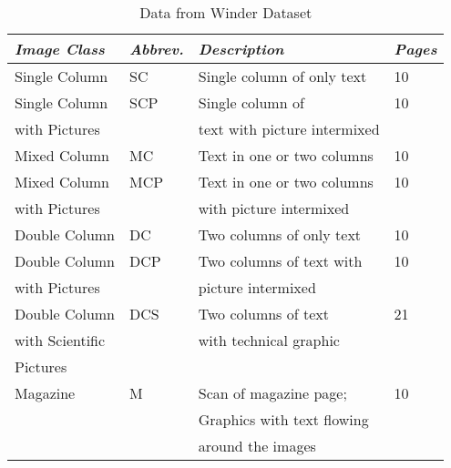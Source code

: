 \documentclass[conference]{IEEEtran}
\begin{document}

%

\begin{table}
\caption{Data from Winder Dataset}
\label{table:Winder Image Classes}
\begin{tabular}{|l|l|l|l|}
\hline
\textit{\textbf{Image Class}} & \textit{\textbf{Abbrev.}} & \textit{\textbf{Description}} & \textit{\textbf{Pages}}  \\ 
\hline
\hline
    Single Column & SC & Single column of only text &  10  \\ 
    \hline
    Single Column & SCP & Single column of & 10 \\
    with Pictures &     & text with picture intermixed &    \\ 
    \hline

    Mixed Column & MC & Text in one or two columns & 10 \\
    \hline

    Mixed Column & MCP & Text in one or two columns & 10 \\
    with Pictures&    & with picture intermixed & \\

    \hline
    Double Column & DC & Two columns of only text & 10 \\  
    \hline
    Double Column & DCP & Two columns of text with & 10 \\ 
    with Pictures &     & picture intermixed &    \\  
    \hline
    Double Column  & DCS & Two columns of text & 21 \\
    with Scientific &     &  with technical graphic  & \\ 
    Pictures &  & & \\ 
    \hline
    Magazine & M & Scan of magazine page; & 10 \\
             &   & Graphics with text flowing & \\
             &   & around the images & \\
\hline
\end{tabular}
\end{table}
\end{document}
